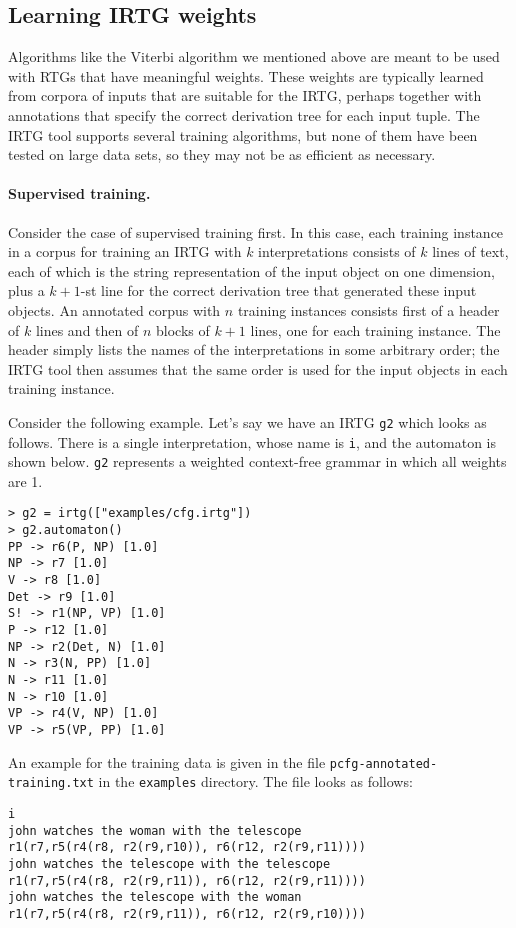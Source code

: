 \documentclass[11pt]{article}
\begin{document}
\subsection{Learning IRTG weights}

Algorithms like the Viterbi algorithm we mentioned above are meant to
be used with RTGs that have meaningful weights.  These weights are
typically learned from corpora of inputs that are suitable for the
IRTG, perhaps together with annotations that specify the correct
derivation tree for each input tuple.  The IRTG tool supports several
training algorithms, but none of them have been tested on large data
sets, so they may not be as efficient as necessary.

\paragraph{Supervised training.}
Consider the case of supervised training first.  In this case, each
training instance in a corpus for training an IRTG with $k$
interpretations consists of $k$ lines of text, each of which is the
string representation of the input object on one dimension, plus a
$k+1$-st line for the correct derivation tree that generated these
input objects.  An annotated corpus with $n$ training instances
consists first of a header of $k$ lines and then of $n$ blocks of
$k+1$ lines, one for each training instance.  The header simply lists
the names of the interpretations in some arbitrary order; the IRTG
tool then assumes that the same order is used for the input objects in
each training instance.

Consider the following example. Let's say we have an IRTG \verb?g2?
which looks as follows. There is a single interpretation, whose name
is \verb?i?, and the automaton is shown below. \verb?g2? represents a
weighted context-free grammar in which all weights are 1.

\begin{verbatim}
> g2 = irtg(["examples/cfg.irtg"])
> g2.automaton()
PP -> r6(P, NP) [1.0]
NP -> r7 [1.0]
V -> r8 [1.0]
Det -> r9 [1.0]
S! -> r1(NP, VP) [1.0]
P -> r12 [1.0]
NP -> r2(Det, N) [1.0]
N -> r3(N, PP) [1.0]
N -> r11 [1.0]
N -> r10 [1.0]
VP -> r4(V, NP) [1.0]
VP -> r5(VP, PP) [1.0]
\end{verbatim}

An example for the training data is given in the file
\verb?pcfg-annotated-training.txt? in the \verb?examples?
directory. The file looks as follows:

\begin{verbatim}
i
john watches the woman with the telescope
r1(r7,r5(r4(r8, r2(r9,r10)), r6(r12, r2(r9,r11))))
john watches the telescope with the telescope
r1(r7,r5(r4(r8, r2(r9,r11)), r6(r12, r2(r9,r11))))
john watches the telescope with the woman
r1(r7,r5(r4(r8, r2(r9,r11)), r6(r12, r2(r9,r10))))
\end{verbatim}
\end{document}
